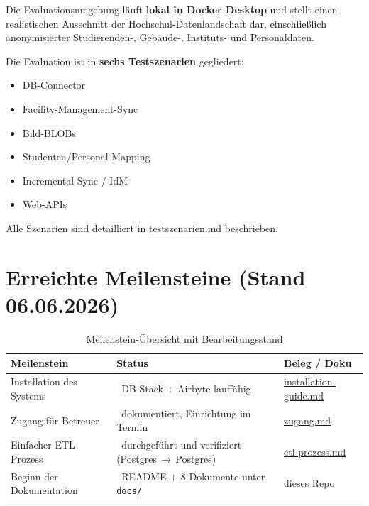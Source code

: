 \documentclass[a4paper,12pt]{article}
\newcommand{\done}{\textcolor{statusGreen}{\ding{52}}}      %
\newcommand{\inprog}{\textcolor{statusOrange}{\ding{119}}}  %
\begin{document}
Die Evaluationsumgebung läuft \textbf{lokal in Docker Desktop} und stellt einen
realistischen Ausschnitt der Hochschul-Datenlandschaft dar, einschließlich anonymisierter
Studierenden-, Gebäude-, Instituts- und Personaldaten.
 
Die Evaluation ist in \textbf{sechs Testszenarien} gegliedert:
\begin{itemize}[noitemsep, leftmargin=*]
    \item DB-Connector
    \item Facility-Management-Sync
    \item Bild-BLOBs
    \item Studenten/Personal-Mapping
    \item Incremental Sync / IdM
    \item Web-APIs
\end{itemize}
 
Alle Szenarien sind detailliert in
\href{https://github.com/Timbo3399/INFM_Airbyte/blob/main/docs/testszenarien.md}{testszenarien.md}
beschrieben.
 
\section{Erreichte Meilensteine (Stand 06.06.2026)}
 
\begin{table}[H]
    \caption{Meilenstein-Übersicht mit Bearbeitungsstand}
    \centering\small
    \begin{tabular}{@{}L{6.2cm}C{3.2cm}L{5cm}@{}}
        \toprule
        \textbf{Meilenstein} & \textbf{Status} & \textbf{Beleg / Doku} \\
        \midrule
        Installation des Systems &
            \done~DB-Stack + Airbyte lauffähig &
            \href{https://github.com/Timbo3399/INFM_Airbyte/blob/main/docs/installation-guide.md}{installation-guide.md} \\
        \addlinespace[4pt]
        Zugang für Betreuer &
            \inprog~dokumentiert, Einrichtung im Termin &
            \href{https://github.com/Timbo3399/INFM_Airbyte/blob/main/docs/zugang.md}{zugang.md} \\
        \addlinespace[4pt]
        Einfacher ETL-Prozess &
            \done~durchgeführt und verifiziert (Postgres\,$\rightarrow$\,Postgres) &
            \href{https://github.com/Timbo3399/INFM_Airbyte/blob/main/docs/etl-prozess.md}{etl-prozess.md} \\
        \addlinespace[4pt]
        Beginn der Dokumentation &
            \done~README + 8 Dokumente unter \texttt{docs/} &
            dieses Repo \\
        \bottomrule
    \end{tabular}
\end{table}
 
\end{document}
